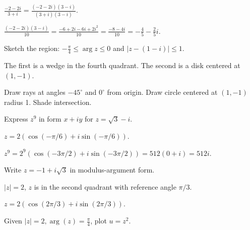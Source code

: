 \begin{hint}
$\frac{-2-2i}{3+i} = \frac{(-2-2i)(3-i)}{(3+i)(3-i)}$.
\end{hint}

\begin{solution}[Sketch]
$\frac{(-2-2i)(3-i)}{10} = \frac{-6+2i-6i+2i^2}{10} = \frac{-8-4i}{10} = -\frac{4}{5} - \frac{2}{5}i$.
\end{solution}

\begin{problem}
Sketch the region: $-\frac{\pi}{4} \le \arg z \le 0$ and $|z - (1-i)| \le 1$.
\end{problem}

\begin{hint}
The first is a wedge in the fourth quadrant. The second is a disk centered at $(1,-1)$.
\end{hint}

\begin{solution}[Sketch]
Draw rays at angles $-45^\circ$ and $0^\circ$ from origin. Draw circle centered at $(1,-1)$ radius 1. Shade intersection.
\end{solution}

\begin{problem}
Express $z^9$ in form $x+iy$ for $z=\sqrt{3}-i$.
\end{problem}

\begin{hint}
$z = 2(\cos(-\pi/6) + i\sin(-\pi/6))$.
\end{hint}

\begin{solution}[Sketch]
$z^9 = 2^9(\cos(-3\pi/2) + i\sin(-3\pi/2)) = 512(0 + i) = 512i$.
\end{solution}

\begin{problem}
Write $z=-1+i\sqrt{3}$ in modulus-argument form.
\end{problem}

\begin{hint}
$|z| = 2$, $z$ is in the second quadrant with reference angle $\pi/3$.
\end{hint}

\begin{solution}[Sketch]
$z = 2(\cos(2\pi/3) + i\sin(2\pi/3))$.
\end{solution}

\begin{problem}
Given $|z|=2, \arg(z)=\frac{\pi}{4}$, plot $u=z^2$.
\end{problem}

